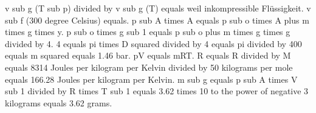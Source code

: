 v sub g (T sub p) divided by v sub g (T) equals weil inkompressible Flüssigkeit. v sub f (300 degree Celsius) equals. p sub A times A equals p sub o times A plus m times g times y. p sub o times g sub 1 equals p sub o plus m times g times g divided by 4. 4 equals pi times D squared divided by 4 equals pi divided by 400 equals m squared equals 1.46 bar. pV equals mRT. R equals R divided by M equals 8314 Joules per kilogram per Kelvin divided by 50 kilograms per mole equals 166.28 Joules per kilogram per Kelvin. m sub g equals p sub A times V sub 1 divided by R times T sub 1 equals 3.62 times 10 to the power of negative 3 kilograms equals 3.62 grams.